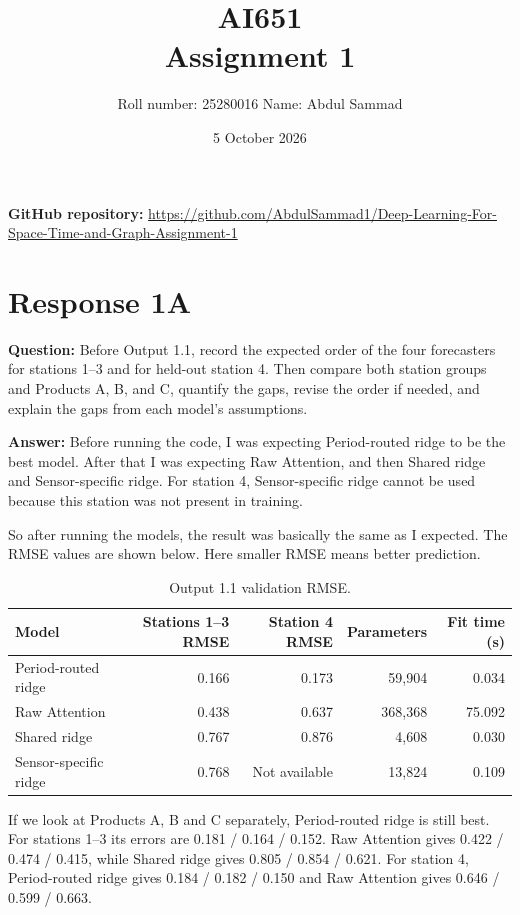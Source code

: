 \documentclass[11pt]{article}
\title{AI651\\ Assignment 1}
\author{Roll number: 25280016 \quad Name: Abdul Sammad}
\date{5 October 2026}
\begin{document}
\maketitle

\noindent\textbf{GitHub repository:} \url{https://github.com/AbdulSammad1/Deep-Learning-For-Space-Time-and-Graph-Assignment-1}

\section*{Response 1A}
\textbf{Question:} Before Output 1.1, record the expected order of the four forecasters for stations 1--3 and for held-out station 4. Then compare both station groups and Products A, B, and C, quantify the gaps, revise the order if needed, and explain the gaps from each model's assumptions.

\textbf{Answer:} Before running the code, I was expecting Period-routed ridge to be the best model. After that I was expecting Raw Attention, and then Shared ridge and Sensor-specific ridge. For station 4, Sensor-specific ridge cannot be used because this station was not present in training.

So after running the models, the result was basically the same as I expected. The RMSE values are shown below. Here smaller RMSE means better prediction.

\begin{table}[H]
\centering
\small
\begin{tabular}{lrrrr}
\toprule
Model & Stations 1--3 RMSE & Station 4 RMSE & Parameters & Fit time (s) \\
\midrule
Period-routed ridge & 0.166 & 0.173 & 59{,}904 & 0.034 \\
Raw Attention & 0.438 & 0.637 & 368{,}368 & 75.092 \\
Shared ridge & 0.767 & 0.876 & 4{,}608 & 0.030 \\
Sensor-specific ridge & 0.768 & Not available & 13{,}824 & 0.109 \\
\bottomrule
\end{tabular}
\caption{Output 1.1 validation RMSE.}
\end{table}

If we look at Products A, B and C separately, Period-routed ridge is still best. For stations 1--3 its errors are 0.181 / 0.164 / 0.152. Raw Attention gives 0.422 / 0.474 / 0.415, while Shared ridge gives 0.805 / 0.854 / 0.621. For station 4, Period-routed ridge gives 0.184 / 0.182 / 0.150 and Raw Attention gives 0.646 / 0.599 / 0.663.
\end{document}
